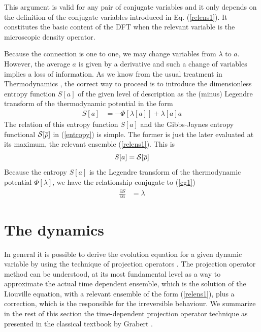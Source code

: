 \documentclass[b5paper,openright,11pt]{book}
\begin{document}
This argument is  valid for  any pair  of conjugate variables  and it
only depends on  the definition of the  conjugate variables introduced
in Eq. (\ref{relens1}).  It constitutes  the basic content of the DFT
when the relevant variable is the microscopic density operator.

Because the  connection is one  to one,  we may change  variables from
$\lambda$ to $a$.   However, the average $a$ is given  by a derivative
and such a  change of variables implies a loss  of information.  As we
know from the usual treatment in Thermodynamics \cite{Callen1960}, the
correct way to proceed is to  introduce the dimensionless entropy function $S[a]$ of
the given  level of description  as the (minus) Legendre  transform of
the thermodynamic potential in the form
\begin{align}
S[a] &=-\Phi[\lambda[a]]+\lambda[a] a
\label{entropya}\end{align}
The  relation of  this entropy  function $S[a]$  and the  Gibbs-Jaynes
entropy functional  ${\cal S}[\overline{\rho}]$ in  (\ref{entropy}) is
simple. The  former is just  the later  evaluated at its  maximum, the
relevant ensemble (\ref{relens1}). This is
\begin{align}
S[a]={\cal  S}[\overline{\rho}]
\end{align}
Because  the  entropy   $S[a]$  is  the  Legendre   transform  of  the
thermodynamic  potential  $\Phi[\lambda]$,  we have  the  relationship
conjugate to (\ref{cg1})
\begin{align}
  \frac{\partial S}{\partial a}&=\lambda
\label{e3}
\end{align}


\section{The dynamics}\label{Sec:Grabert}
In general it is possible to derive the evolution equation for a given
dynamic  variable  by  using  the technique  of  projection  operators
\cite{Kawasaki1973a,Grabert1982}. The projection operator method can be
understood, at its most fundamental level  as a way to approximate the
actual time dependent ensemble, which is the solution of the Liouville
equation, with a relevant  ensemble of the form (\ref{relens1}),
plus  a correction,  which  is the  responsible  for the  irreversible
behaviour. We  summarize   in  the   rest  of   this  section   the
time-dependent  projection  operator  technique as  presented  in  the
classical  textbook  by Grabert  \cite{Grabert1982}.   
\end{document}

